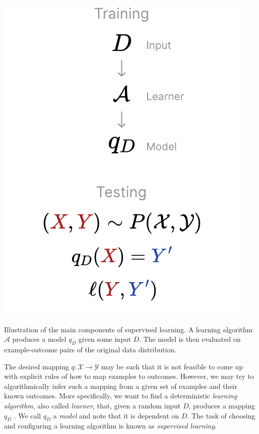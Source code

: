 \documentclass[
	twoside=false, %
]{kaobook}
\begin{document}
\begin{marginfigure}
	\includegraphics[width=\textwidth]{figma-illustrations/supervised-learning}
	\label{fig:supervised-learning}
	\caption{Illustration of the main components of supervised learning. A learning algorithm $\mathcal{A}$ produces a model $q_D$ given some input $D$. The model is then evaluated on example-outcome pairs of the original data distribution.}
\end{marginfigure}

The desired mapping $q: \mathcal{X} \to \mathcal{Y}$ may be such that it is not feasible to come up with explicit rules of how to map examples to outcomes. However, we may try to algorithmically infer such a mapping from a given set of examples and their known outcomes. More specifically, we want to find a deterministic \textit{learning algorithm}, also called \textit{learner}, that, given a random input $D$, produces a mapping $q_D$
.
We call $q_D$ a \textit{model} and note that it is dependent on $D$.
The task of choosing and configuring a learning algorithm is known as \textit{supervised learning}.
\end{document}
